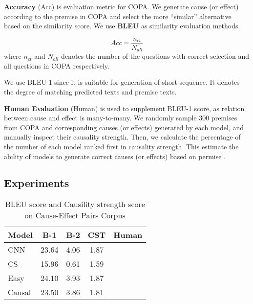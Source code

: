 \textbf{Accuracy} (Acc) is evaluation metric for COPA.
We generate cause (or effect) according to the premise in COPA
and select the more ``similar'' alternative based on the similarity
score. We use \textbf{BLEU} as similarity evaluation methods.

\begin{equation}
Acc = \frac{n_{ct}}{N_{all}}
\end{equation}
where $n_{ct}$ and $N_{all}$ denotes
the number of the questions with correct selection
and all questions in COPA respectively.

We use BLEU-1 since it is suitable for generation
of short sequence. It denotes the degree of matching 
predicted texts and premise texts. 

\textbf{Human Evaluation} (Human) is used to supplement
BLEU-1 score, as relation between cause and effect is many-to-many.
We randomly sample 300 premises from COPA and 
corresponding causes (or effects) generated
by each model, and manually inspect their causality strength.
Then, we calculate the percentage of the number of each model ranked 
first in causality strength. This estimate the 
ability of models to generate correct causes (or effects) based on permise .

\subsection{Experiments}
\label{sec:exp}

\begin{table}[th]
	\centering
    \small
	\begin{tabular}{|l|c|c|c|c|}
		\hline
		Model &   B-1  & B-2 & CST & Human \\
		\hline
		CNN & 23.64 & 4.06 & 1.87 & \\
		CS  & 15.96	& 0.61 & 1.59 & \\
		Easy & 24.10 & 3.93 & 1.87 & \\
		\hline
		Causal & 23.50 & 3.86 & 1.81 & \\
		\hline
	\end{tabular}
	\caption{BLEU score and Causility strength score on Cause-Effect Pairs Corpus}
	\label{tab:novel}
\end{table}

